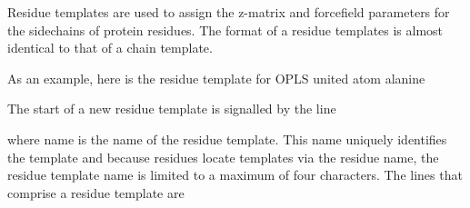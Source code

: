 \documentclass[letterpaper,10pt,english]{sphinxmanual}
\begin{document}

Residue templates are used to assign the z-matrix and forcefield parameters for the sidechains of protein residues. The format of a residue templates is almost identical to that of a chain template.

As an example, here is the residue template for OPLS united atom alanine

%
\begin{sphinxVerbatim}[commandchars=\\\{\}]
 
 
    
        
        
      
   
     
 
        
\end{sphinxVerbatim}

The start of a new residue template is signalled by the line

%
\begin{sphinxVerbatim}[commandchars=\\\{\}]
 
\end{sphinxVerbatim}

where name is the name of the residue template. This name uniquely identifies the template and because residues locate templates via the residue name, the residue template name is limited to a maximum of four characters. The lines that comprise a residue template are

%
\begin{sphinxVerbatim}[commandchars=\\\{\}]
    
\end{sphinxVerbatim}
\end{document}
